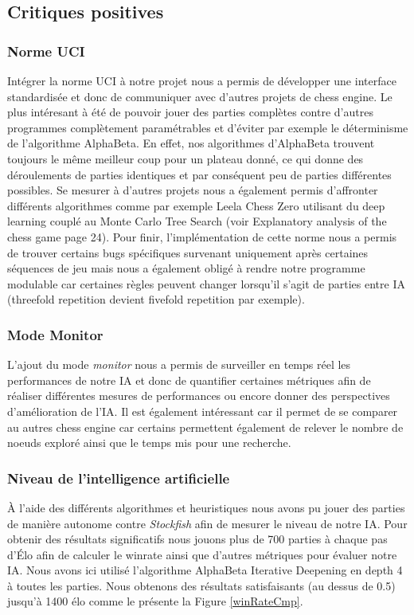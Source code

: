\documentclass{article}
\begin{document}
\subsection{Critiques positives}
\subsubsection{Norme UCI}
Intégrer la norme UCI à notre projet nous a permis de développer une interface standardisée et donc de communiquer avec d'autres projets de chess engine.
Le plus intéresant à été de pouvoir jouer des parties complètes contre d'autres programmes complètement paramétrables et d'éviter par exemple le déterminisme
de l'algorithme AlphaBeta. En effet, nos algorithmes d'AlphaBeta trouvent toujours le même meilleur coup pour un plateau donné, ce qui donne des déroulements de parties
identiques et par conséquent peu de parties différentes possibles. Se mesurer à d'autres projets nous a également permis d'affronter différents algorithmes comme par exemple
Leela Chess Zero utilisant du deep learning couplé au Monte Carlo Tree Search (voir Explanatory analysis of the chess game \cite{GameEngine} page 24).
Pour finir, l'implémentation de cette norme nous a permis de trouver certains bugs spécifiques survenant uniquement après certaines séquences de jeu mais nous a également
obligé à rendre notre programme modulable car certaines règles peuvent changer lorsqu'il s'agit de parties entre IA (threefold repetition devient fivefold repetition par exemple).
\subsubsection{Mode Monitor}
L'ajout du mode \textit{monitor} nous a permis de surveiller en temps réel les performances de notre IA et donc de quantifier certaines métriques afin de réaliser différentes mesures de
performances ou encore donner des perspectives d'amélioration de l'IA. Il est également intéressant car il permet de se comparer au autres chess engine car certains permettent également 
de relever le nombre de noeuds exploré ainsi que le temps mis pour une recherche.

\subsubsection{Niveau de l'intelligence artificielle}
À l'aide des différents algorithmes et heuristiques nous avons pu jouer des parties de manière autonome contre \textit{Stockfish} afin de mesurer le niveau de notre IA.
Pour obtenir des résultats significatifs nous jouons plus de 700 parties à chaque pas d'Élo afin de calculer le winrate ainsi que d'autres métriques pour évaluer notre IA.
Nous avons ici utilisé l'algorithme AlphaBeta Iterative Deepening en depth 4 à toutes les parties. Nous obtenons des résultats satisfaisants (au dessus de 0.5) jusqu’à 1400 élo comme le présente la Figure \ref{winRateCmp}.
\end{document}
